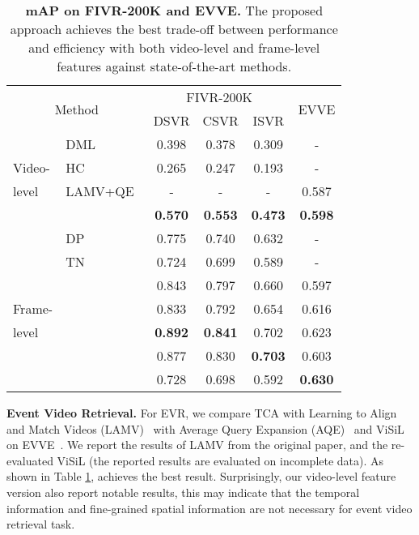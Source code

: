 \documentclass[10pt,twocolumn,letterpaper]{article}
\begin{document}
\begin{table}[htb]
\setlength{\tabcolsep}{5.25pt}
{\small
\begin{tabular}{llcccc}
\toprule
\multicolumn{2}{c}{\multirow{2}{*}{Method}} & \multicolumn{3}{c}{FIVR-200K} & \multirow{2}{*}{EVVE} \\
\cmidrule{3-5}
\multicolumn{2}{c}{}                        & DSVR     & CSVR     & ISVR   \\
\midrule
                    & DML~\cite{kordopatis2017dml}                   & 0.398    & 0.378    & 0.309  & - \\
Video-              & HC~\cite{song2013effective}                    & 0.265    & 0.247    & 0.193  & - \\
level               & LAMV+QE~\cite{baraldi2018lamv}                 & -        & -        & -      & 0.587 \\
                    &          & \textbf{0.570}   & \textbf{0.553}   & \textbf{0.473}    & \textbf{0.598} \\
\cmidrule{1-6}
                    & DP~\cite{chou2015pattern}                         & 0.775    & 0.740    & 0.632   & -     \\
                    & TN~\cite{tan2009scalable}                         & 0.724    & 0.699    & 0.589   & -     \\
                    & ~\cite{kordopatis2019visil}       & 0.843    & 0.797    & 0.660   & 0.597 \\
Frame-              & ~\cite{kordopatis2019visil}   & 0.833    & 0.792    & 0.654   & 0.616 \\
level               & ~\cite{kordopatis2019visil}       & \textbf{0.892}      & \textbf{0.841}    & 0.702   & 0.623 \\
                    &          & 0.877    & 0.830    & \textbf{0.703}    & 0.603 \\
                    &          & 0.728    & 0.698    & 0.592    & \textbf{0.630} \\
\bottomrule
\end{tabular}
}
\caption{\textbf{mAP on FIVR-200K and EVVE.} The proposed approach achieves the best trade-off between performance and efficiency with both video-level and frame-level features against state-of-the-art methods.} \label{tab:fivr}
\end{table}

\noindent\textbf{Event Video Retrieval.} \label{paragraph:evr}
For EVR, we compare TCA with Learning to Align and Match Videos (LAMV)~\cite{baraldi2018lamv} with Average Query Expansion (AQE)~\cite{douze2013stable} and ViSiL~\cite{kordopatis2019visil} on EVVE~\cite{revaud2013event}. We report the results of LAMV from the original paper, and the re-evaluated ViSiL (the reported results are evaluated on incomplete data). As shown in Table \ref{tab:fivr},  achieves the best result. Surprisingly, our video-level feature version  also report notable results, this may indicate that the temporal information and fine-grained spatial information are not necessary for event video retrieval task.
\end{document}
